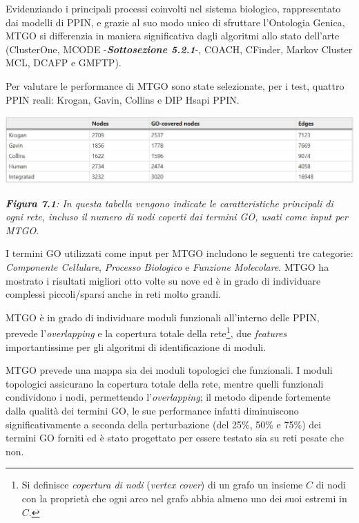 \documentclass[11pt]{article}
\begin{document}
Evidenziando i principali processi coinvolti nel sistema biologico, rappresentato dai modelli di PPIN, e grazie al suo modo unico di sfruttare l'Ontologia Genica, MTGO si differenzia in maniera significativa dagli algoritmi allo stato dell'arte (ClusterOne, MCODE -\textit{\textbf{Sottosezione 5.2.1}}-, COACH, CFinder, Markov Cluster MCL, DCAFP e GMFTP). 

Per valutare le performance di MTGO sono state selezionate, per i test, quattro PPIN reali: Krogan, Gavin, Collins e DIP Hsapi PPIN.\\

\begin{center}
\includegraphics[scale=0.5]{tab1}

\begin{small}\textit{\textbf{Figura 7.1}: In questa tabella vengono indicate le caratteristiche principali di ogni rete, incluso il numero di nodi coperti dai termini GO, usati come input per MTGO}.\end{small}
\end{center}

I termini GO utilizzati come input per MTGO includono le seguenti tre categorie: \textit{Componente Cellulare}, \textit{Processo Biologico} e \textit{Funzione Molecolare}. 
MTGO ha mostrato i risultati migliori otto volte su nove ed è in grado di individuare complessi piccoli/sparsi anche in reti molto grandi.

MTGO è in grado di individuare moduli funzionali all'interno delle PPIN, prevede l'\textit{overlapping} e la copertura totale della rete\footnote{Si definisce \textit{copertura di nodi} (\textit{vertex cover}) di un grafo un insieme $C$ di nodi con la proprietà che ogni arco nel grafo abbia almeno uno dei suoi estremi in $C$.}, due \textit{features} importantissime per gli algoritmi di identificazione di moduli.

MTGO prevede una mappa sia dei moduli topologici che funzionali. I moduli topologici assicurano la copertura totale della rete, mentre quelli funzionali condividono i nodi, permettendo l'\textit{overlapping}; il metodo dipende fortemente dalla qualità dei termini GO, le sue performance infatti diminuiscono significativamente a seconda della perturbazione (del 25\%, 50\% e 75\%) dei termini GO forniti ed è stato progettato per essere testato sia su reti pesate che non. 
\end{document}
